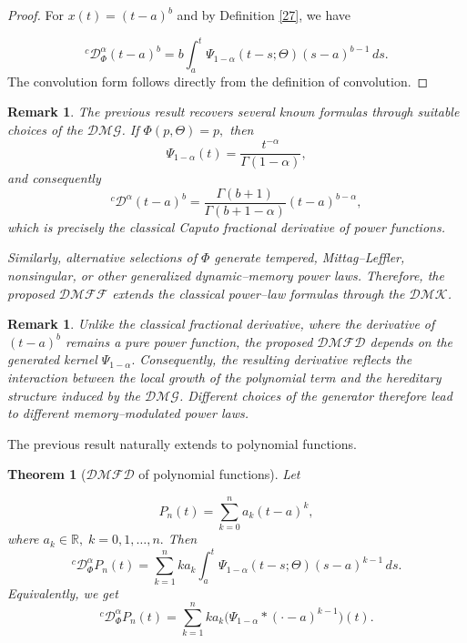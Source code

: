 \documentclass[11pt]{article}
\numberwithin{equation}{section}
\newtheorem{theorem}[definition]{Theorem}
\newtheorem{remark}[definition]{Remark}
\begin{document}
\begin{proof}
For
\(
x(t)
=
(t-a)^b 
\) and by
Definition \ref{27}, we have

\[
{}^c \mathcal D_\Phi^\alpha
(t-a)^b
=
b
\int_a^t
\Psi_{1-\alpha}(t-s;\Theta)
(s-a)^{b-1}
\,ds.
\]
The convolution form follows directly from the definition of convolution.
\end{proof}

\begin{remark}
The previous result recovers several known formulas through suitable choices of the $\mathcal{DMG}$.
If
\(
\Phi(p,\Theta)
=
p,
\)
then
\[
\Psi_{1-\alpha}(t)
=
\frac{t^{-\alpha}}
{\Gamma(1-\alpha)},
\]
and consequently
\[
{}^c \mathcal D^\alpha
(t-a)^b
=
\frac{\Gamma(b+1)}
{\Gamma(b+1-\alpha)}
(t-a)^{b-\alpha},
\]
which is precisely the classical Caputo fractional derivative of power functions.

Similarly, alternative selections of
\(
\Phi
\)
generate tempered, Mittag--Leffler, nonsingular,
or other generalized dynamic--memory power laws.
Therefore, the proposed $\mathcal{DMFF}$ extends the classical power--law formulas through
the $\mathcal{DMK}$.
\end{remark}

\begin{remark}
Unlike the classical fractional derivative, where the derivative of
\(
(t-a)^b
\)
remains a pure power function, the proposed $\mathcal{DMFD}$ depends on the generated kernel
\(
\Psi_{1-\alpha}.
\)
Consequently, the resulting derivative reflects the interaction between the local growth
of the polynomial term and the hereditary structure induced by the $\mathcal{DMG}$. Different
choices of the generator therefore lead to different memory--modulated power laws.
\end{remark}


The previous result naturally extends to polynomial functions.

\begin{theorem}[$\mathcal{DMFD}$ of polynomial functions]
Let

\[
P_n(t)
=
\sum_{k=0}^{n}
a_k
(t-a)^k,
\]
where
\(
a_k\in\mathbb R,
\;
k=0,1,\ldots,n.
\)
Then
\[
{}^c \mathcal D_\Phi^\alpha
P_n(t)
=
\sum_{k=1}^{n}
k a_k
\int_a^t
\Psi_{1-\alpha}(t-s;\Theta)
(s-a)^{k-1}
\,ds.
\]
Equivalently, we get
\[
{}^c \mathcal D_\Phi^\alpha
P_n(t)
=
\sum_{k=1}^{n}
k a_k
\Big(
\Psi_{1-\alpha}
*
(\cdot-a)^{k-1}
\Big)(t).
\]

\end{theorem}
\end{document}
